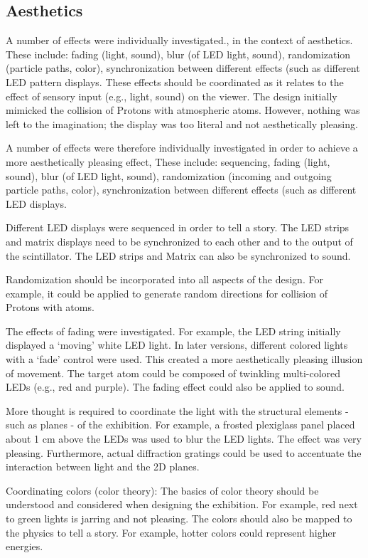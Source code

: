 \documentclass{article}
\begin{document}
\subsection{Aesthetics}
A number of effects were individually investigated., in the context of aesthetics. These include: fading (light, sound), blur (of LED light, sound), randomization (particle paths, color), synchronization between different effects (such as different LED pattern displays. These effects should be coordinated as it relates to the effect of sensory input (e.g., light, sound) on the viewer. The design initially mimicked the collision of Protons with atmospheric atoms. However, nothing was left to the imagination; the display was too literal and not aesthetically pleasing.

A number of effects were therefore individually investigated in order to achieve a more aesthetically pleasing effect, These include: sequencing, fading (light, sound), blur (of LED light, sound), randomization (incoming and outgoing particle paths, color), synchronization between different effects (such as different LED displays.

Different LED displays were sequenced in order to tell a story. The LED strips and matrix displays need to be synchronized to each other and to the output of the scintillator. The LED strips and Matrix can also be synchronized to sound.

Randomization should be incorporated into all aspects of the design. For example, it could be applied to generate random directions for collision of Protons with atoms.

The effects of fading were investigated. For example, the LED string initially displayed a ‘moving’ white LED light. In later versions, different colored lights with a ‘fade’ control were used. This created a more aesthetically pleasing illusion of movement. The target atom could be composed of twinkling multi-colored LEDs (e.g., red and purple). The fading effect could also be applied to sound. 

More thought is required to coordinate the light with the structural elements - such as planes - of the exhibition. For example, a frosted plexiglass panel placed about 1 cm above the LEDs was used to blur the LED lights. The effect was very pleasing. Furthermore, actual diffraction gratings could be used to accentuate the interaction between light and the 2D planes. 

Coordinating colors (color theory): The basics of color theory should be understood and considered when designing the exhibition. For example, red next to green lights is jarring and not pleasing. The colors should also be mapped to the physics to tell a story. For example, hotter colors could represent higher energies. 
\end{document}
